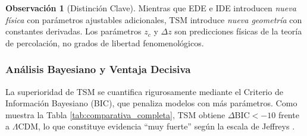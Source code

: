 \documentclass[11pt, a4paper]{article}
\theoremstyle{plain}
\theoremstyle{definition}
\newtheorem{observacion}[teorema]{Observación}
\begin{document}
\begin{observacion}[Distinción Clave]
Mientras que EDE e IDE introducen \textit{nueva física} con parámetros ajustables adicionales, TSM introduce \textit{nueva geometría} con constantes derivadas. Los parámetros $z_c$ y $\Delta z$ son predicciones físicas de la teoría de percolación, no grados de libertad fenomenológicos.
\end{observacion}


\subsubsection{Análisis Bayesiano y Ventaja Decisiva}
\label{subsec:analisis_bayesiano}

La superioridad de TSM se cuantifica rigurosamente mediante el Criterio de Información Bayesiano (BIC), que penaliza modelos con más parámetros. Como muestra la Tabla \ref{tab:comparativa_completa}, TSM obtiene $\Delta\text{BIC} < -10$ frente a $\Lambda$CDM, lo que constituye evidencia ``muy fuerte'' según la escala de Jeffreys \cite{Kass1995}.


\begin{table}[H]
\centering
\caption{Comparación de modelos frente a tensiones observacionales (2025)}
\label{tab:comparativa_completa}
\end{table}
\end{document}
